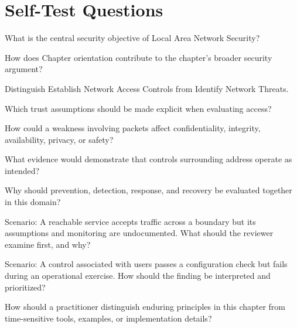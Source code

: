 \documentclass[11pt,letterpaper]{article}
\begin{document}
\section*{Self-Test Questions}
\begin{CornellRecallList}
\item What is the central security objective of Local Area Network Security?
\item How does Chapter orientation contribute to the chapter's broader security argument?
\item Distinguish Establish Network Access Controls from Identify Network Threats.
\item Which trust assumptions should be made explicit when evaluating access?
\item How could a weakness involving packets affect confidentiality, integrity, availability, privacy, or safety?
\item What evidence would demonstrate that controls surrounding address operate as intended?
\item Why should prevention, detection, response, and recovery be evaluated together in this domain?
\item Scenario: A reachable service accepts traffic across a boundary but its assumptions and monitoring are undocumented. What should the reviewer examine first, and why?
\item Scenario: A control associated with users passes a configuration check but fails during an operational exercise. How should the finding be interpreted and prioritized?
\item How should a practitioner distinguish enduring principles in this chapter from time-sensitive tools, examples, or implementation details?
\end{CornellRecallList}
\end{document}
